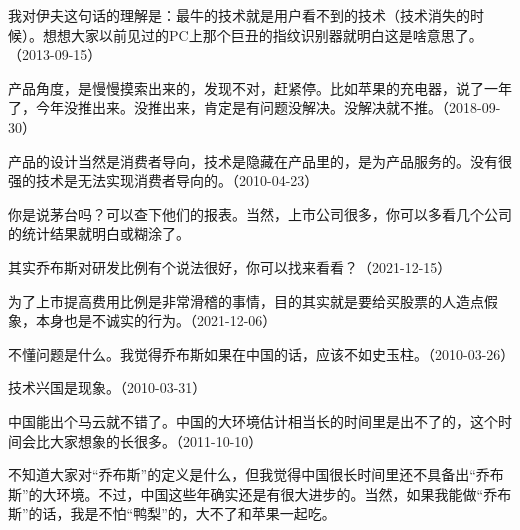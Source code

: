 我对伊夫这句话的理解是：最牛的技术就是用户看不到的技术（技术消失的时候）。想想大家以前见过的PC上那个巨丑的指纹识别器就明白这是啥意思了。（2013-09-15）


产品角度，是慢慢摸索出来的，发现不对，赶紧停。比如苹果的充电器，说了一年了，今年没推出来。没推出来，肯定是有问题没解决。没解决就不推。（2018-09-30）


产品的设计当然是消费者导向，技术是隐藏在产品里的，是为产品服务的。没有很强的技术是无法实现消费者导向的。（2010-04-23）


你是说茅台吗？可以查下他们的报表。当然，上市公司很多，你可以多看几个公司的统计结果就明白或糊涂了。

其实乔布斯对研发比例有个说法很好，你可以找来看看？（2021-12-15）


为了上市提高费用比例是非常滑稽的事情，目的其实就是要给买股票的人造点假象，本身也是不诚实的行为。（2021-12-06）


不懂问题是什么。我觉得乔布斯如果在中国的话，应该不如史玉柱。（2010-03-26）


技术兴国是现象。（2010-03-31）


中国能出个马云就不错了。中国的大环境估计相当长的时间里是出不了的，这个时间会比大家想象的长很多。（2011-10-10）

不知道大家对“乔布斯”的定义是什么，但我觉得中国很长时间里还不具备出“乔布斯”的大环境。不过，中国这些年确实还是有很大进步的。当然，如果我能做“乔布斯”的话，我是不怕“鸭梨”的，大不了和苹果一起吃。


